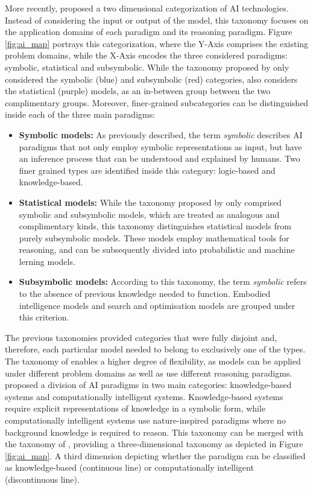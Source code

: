 More recently, \citep{corea_ai_2019} proposed a two dimensional categorization of AI technologies. Instead of considering the input or output of the model, this taxonomy focuses on the application domains of each paradigm and its reasoning paradigm. Figure \ref{fig:ai_map} portrays this categorization, where the Y-Axis comprises the existing problem domains, while the X-Axis encodes the three considered paradigms: symbolic, statistical and subsymbolic. While the taxonomy proposed by \citep{lieberman_symbolic_nodate} only considered the symbolic (blue) and subsymbolic (red) categories, \citep{corea_ai_2019} also considers the statistical (purple) models, as an in-between group between the two complimentary groups. Moreover, finer-grained subcategories can be distinguished inside each of the three main paradigms:
\begin{itemize}
    \item \textbf{Symbolic models:} As previously described, the term \textit{symbolic} describes AI paradigms that not only employ symbolic representations as input, but have an inference process that can be understood and explained by humans. Two finer grained types are identified inside this category: logic-based and knowledge-based.
    \item \textbf{Statistical models:} While the taxonomy proposed by \citep{lieberman_symbolic_nodate} only comprised symbolic and subsymbolic models, which are treated as analogous and complimentary kinds, this taxonomy distinguishes statistical models from purely subsymbolic models. These models employ mathematical tools for reasoning, and can be subsequently divided into probabilistic and machine lerning models.
    \item\textbf{Subsymbolic models:} According to this taxonomy, the term \textit{symbolic} refers to the absence of previous knowledge needed to function. Embodied intelligence models and search and optimisation models are grouped under this criterion.
\end{itemize}

The previous taxonomies provided categories that were fully disjoint and, therefore, each particular model needed to belong to exclusively one of the types. The taxonomy of \citep{corea_ai_2019} enables a higher degree of flexibility, as models can be applied under different problem domains as well as use different reasoning paradigms.
\citep{hopgood_2009_knowledge-based} proposed a division of AI paradigms in two main categories: knowledge-based systems and computationally intelligent systems. Knowledge-based systems require explicit representations of knowledge in a symbolic form, while computationally intelligent systems use nature-inspired paradigms where no background knowledge is required to reason. This taxonomy can be merged with the taxonomy of \citep{corea_ai_2019}, providing a three-dimensional taxonomy as depicted in Figure \ref{fig:ai_map}. A third dimension depicting whether the paradigm can be classified as knowledge-based (continuous line) or computationally intelligent (discontinuous line). 


